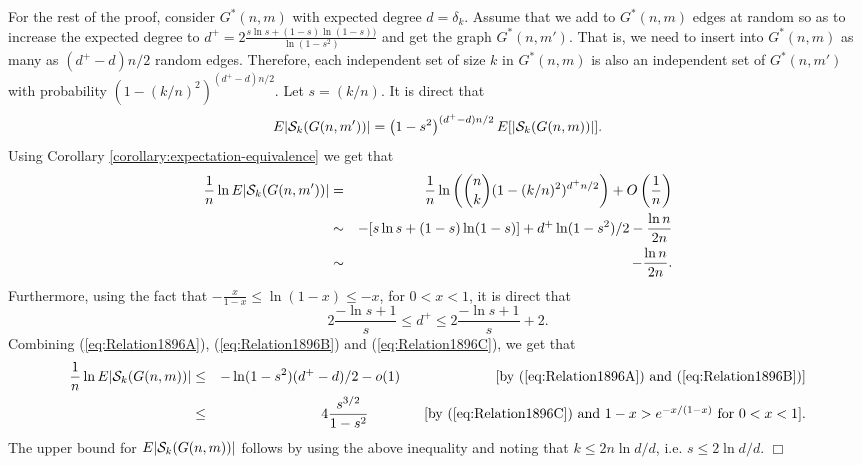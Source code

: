 \documentclass[a4paper,10pt]{article}
\makeatletter
\newenvironment{proof}{\noindent{\bf Proof\@:}}{\hfill $\Box$\\}
\makeatother
\begin{document}
\begin{proof}
For the rest of the proof, consider $G^*(n,m)$ with expected degree
$d=\delta_k$.  Assume that we add to $G^*(n,m)$ edges at random so
as to increase the expected degree to $d^+= 2\frac{s\ln s+(1-s)\ln(1-s))}{\ln(1-s^2)}$ 
and get the graph $G^*(n,m')$.
That is, we need to insert into $G^*(n,m)$ as many as $(d^+-d)n/2$
random edges. Therefore, each independent set of size $k$ in
$G^*(n,m)$ is also an independent set of $G^*(n,m')$ with probability
$\left(1-(k/n)^2 \right)^{(d^+-d)n/2}$. Let $s=(k/n)$. It is direct
that 
\begin{equation}\label{eq:Relation1896A}
E|{\cal S}_k(G(n,m'))|=\left(1-s^2 \right)^{(d^+-d)n/2}E[|{\cal S}_k(G(n,m))|].
\end{equation}
Using Corollary \ref{corollary:expectation-equivalence} we get that
\begin{eqnarray}
\frac{1}{n}\ln E|{\cal S}_k(G(n,m'))|&=&\frac{1}{n}\ln\left({n \choose k}(1-(k/n)^2)^{d^+n/2}\right)+O\left(\frac{1}{n}\right)
\nonumber \\
&\sim&-[s\ln s+(1-s)\ln(1-s)]+d^+\ln(1-s^2)/2-\frac{\ln n}{2n} 
\nonumber \\
&\sim &-\frac{\ln n}{2n}. \label{eq:Relation1896B}
\end{eqnarray}
Furthermore, using the fact that $-\frac{x}{1-x}\leq \ln(1-x)\leq -x$,
for $0<x<1$, it is direct that
\begin{equation}\label{eq:Relation1896C}
2\frac{-\ln s+1}{s}\leq d^+\leq 2\frac{-\ln s+1}{s}+2.
\end{equation}
Combining (\ref{eq:Relation1896A}), (\ref{eq:Relation1896B}) and
(\ref{eq:Relation1896C}), we get that 
\begin{eqnarray*}
\frac{1}{n}\ln E|{\cal S}_k(G(n,m))|&\leq& - \ln(1-s^2)(d^+-d)/2-o(1)
\hspace{2.4cm}\mbox{[by (\ref{eq:Relation1896A}) and (\ref{eq:Relation1896B})]}\\
&\leq &4\frac{s^{3/2}}{1-s^2} \hspace{1.4cm}  \mbox{[by (\ref{eq:Relation1896C})
and $1-x>e^{-x/(1-x)}$ for $0<x<1$]}.
\end{eqnarray*}
The upper bound for $E|{\cal S}_k(G(n,m))|$ follows by using the
above inequality and noting that $k \leq 2n\ln d/d$, i.e.
$s \leq 2\ln d/d$.
\end{proof}
\end{document}
